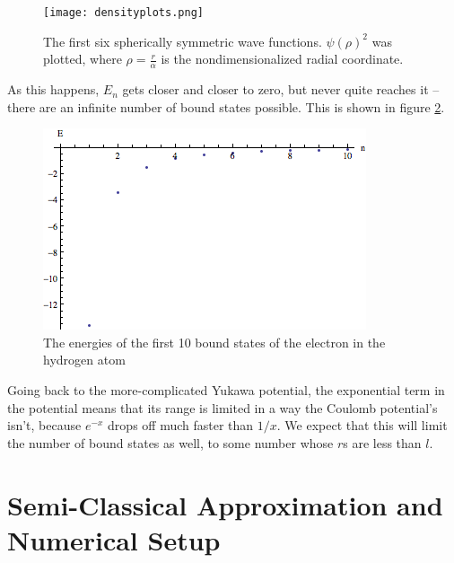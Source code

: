 \documentclass[12pt,twoside]{reedthesis}
\begin{document}
\begin{figure}
\texttt{[image: densityplots.png]}
\caption{The first six spherically symmetric wave functions. $\psi(\rho)^2$ was plotted, where $\rho = \frac{r}{\alpha}$ is the nondimensionalized radial coordinate.}
\label{fig:hfuncs}
\end{figure}
As this happens, $E_n$ gets closer and closer to zero, but never quite reaches it -- there are an infinite number of bound states possible. This is shown in figure \ref{fig:hspec}.
\begin{figure}[h]
\includegraphics[scale=0.75]{hydrogenspectrum.png}
\caption{The energies of the first 10 bound states of the electron in the hydrogen atom}
\label{fig:hspec}
\end{figure}

Going back to the more-complicated Yukawa potential, the exponential term in the potential means that its range is limited in a way the Coulomb potential's isn't, because $e^{-x}$ drops off much faster than $1/x$. We expect that this will limit the number of bound states as well, to some number whose $r$s are less than $l$.

\clearpage %

\chapter{Semi-Classical Approximation and Numerical Setup}
\end{document}

